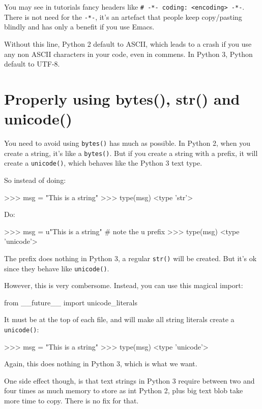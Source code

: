 You may see in tutorials fancy headers like \lstinline{# -*- coding: <encoding> -*-}. There is not need for the \lstinline{-*-}, it's an artefact that people keep copy/pasting blindly and has only a benefit if you use Emacs.

Without this line, Python 2 default to ASCII, which leads to a crash if you use any non ASCII characters in your code, even in commens. In Python 3, Python default to UTF-8.

\section{Properly using bytes(), str() and unicode()}

You need to avoid using \lstinline{bytes()} has much as possible. In Python 2, when you create a string, it's like a \lstinline{bytes()}. But if you create a string with a  prefix, it will create a \lstinline{unicode()}, which behaves like the Python 3 text type.

So instead of doing:

\begin{py2}
>>> msg = "This is a string"
>>> type(msg)
<type 'str'>
\end{py2}

Do:

\begin{py2}
>>> msg = u"This is a string" # note the u prefix
>>> type(msg)
<type 'unicode'>
\end{py2}

The  prefix does nothing in Python 3, a regular \lstinline{str()} will be created. But it's ok since they behave like \lstinline{unicode()}.

However, this is very combersome. Instead, you can use this magical import:

\begin{py2}
from __future__ import unicode_literals
\end{py2}

It must be at the top of each file, and will make all string literals create a \lstinline{unicode()}:

\begin{py2}
>>> msg = "This is a string"
>>> type(msg)
<type 'unicode'>
\end{py2}

Again, this does nothing in Python 3, which is what we want.

One side effect though, is that text strings in Python 3 require between two and four times as much memory to store as int Python 2, plus big text blob take more time to copy. There is no fix for that.

